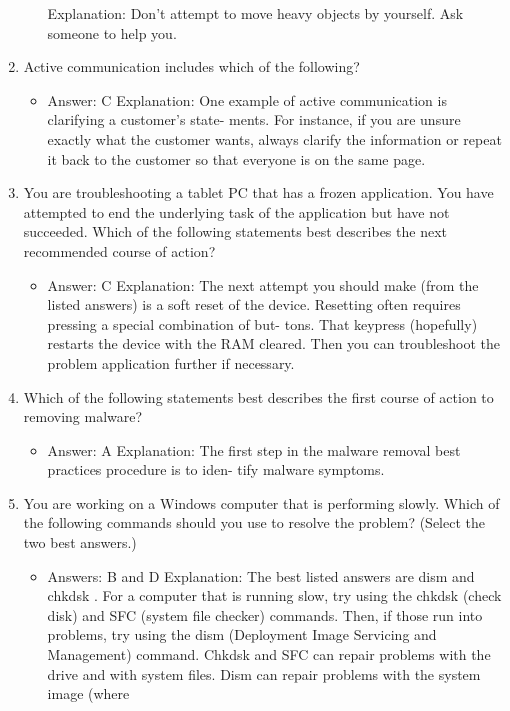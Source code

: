 \documentclass{article}
\begin{document}
\begin{enumerate}
\begin{itemize}
Explanation: Don’t attempt to move heavy objects by yourself. Ask someone to
help you.
    \end{itemize}
    \item Active communication includes which of the following?
    \begin{itemize}
        \item Answer: C
Explanation: One example of active communication is clarifying a customer’s state-
ments. For instance, if you are unsure exactly what the customer wants, always clarify
the information or repeat it back to the customer so that everyone is on the same page.
    \end{itemize}
    \item You are troubleshooting a tablet PC that has a frozen application.
You have attempted to end the underlying task of the application
but have not succeeded. Which of the following statements best
describes the next recommended course of action?
    \begin{itemize}
        \item Answer: C
Explanation: The next attempt you should make (from the listed answers) is a soft
reset of the device. Resetting often requires pressing a special combination of but-
tons. That keypress (hopefully) restarts the device with the RAM cleared. Then you can
troubleshoot the problem application further if necessary.
    \end{itemize}
    \item Which of the following statements best describes the first course
of action to removing malware?
    \begin{itemize}
        \item Answer: A
Explanation: The first step in the malware removal best practices procedure is to iden-
tify malware symptoms.
    \end{itemize}
    \item You are working on a Windows computer that is performing
slowly. Which of the following commands should you use to
resolve the problem? (Select the two best answers.)
    \begin{itemize}
        \item Answers: B and D
Explanation: The best listed answers are dism and chkdsk . For a computer that
is running slow, try using the chkdsk (check disk) and SFC (system file checker)
commands. Then, if those run into problems, try using the dism (Deployment Image
Servicing and Management) command. Chkdsk and SFC can repair problems with the
drive and with system files. Dism can repair problems with the system image (where

\end{itemize}
\end{enumerate}
\end{document}
